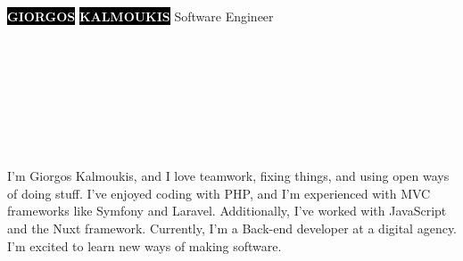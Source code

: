 \documentclass[10pt]{developercv}
\begin{document}
\begin{minipage}[t]{0.45\textwidth}
	\vspace{-\baselineskip}
	\colorbox{black}{{\HUGE\textcolor{white}{\textbf{\MakeUppercase{Giorgos}}}}}
	\colorbox{black}{{\HUGE\textcolor{white}{\textbf{\MakeUppercase{Kalmoukis}}}}}
	\vspace{6pt}
	{\huge Software Engineer}
\end{minipage}
\begin{minipage}[t]{0.275\textwidth}
	\vspace{-\baselineskip}
	\\
	\\
	\\	
\end{minipage}
\begin{minipage}[t]{0.345\textwidth}
	\vspace{-\baselineskip}
	\\
	\\
	\\
\end{minipage}
\vspace{0.5cm}

\begin{minipage}[t]{0.4\textwidth}
	\vspace{-\baselineskip}
	I'm Giorgos Kalmoukis, and I love teamwork, fixing things, and using open ways of doing stuff. I've enjoyed coding with PHP, and I'm experienced with MVC frameworks like Symfony and Laravel. Additionally, I've worked with JavaScript and the Nuxt framework. Currently, I'm a Back-end developer at a digital agency. I'm excited to learn new ways of making software.\\
\end{minipage}
\hfill
\begin{minipage}[t]{0.5\textwidth}
	\vspace{-\baselineskip}
	\begin{barchart}{5.5}
	\end{barchart}
\end{minipage}
\end{document}

